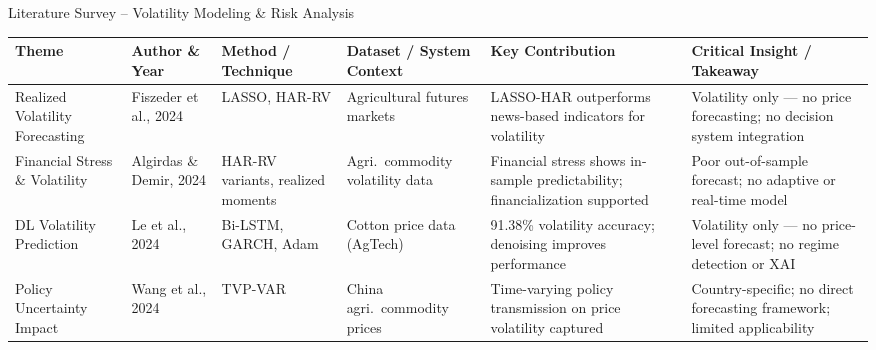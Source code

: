 \documentclass{beamer}
\begin{document}
\begin{frame}[label=lit_vol]{Literature Survey -- Volatility Modeling \& Risk Analysis}
\setlength{\tabcolsep}{2pt}
\renewcommand{\arraystretch}{1.3}
\tiny

\begin{tcolorbox}[enhanced, colback=white, colframe=accentorange!40, arc=4pt, boxrule=0.3pt,
  left=1pt, right=1pt, top=2pt, bottom=2pt, shadow={1pt}{-1pt}{0pt}{black!10}]
\begin{adjustbox}{max width=\textwidth}
\begin{tabular}{|L{1.5cm}|L{1.4cm}|L{1.6cm}|L{1.8cm}|L{2.0cm}|L{2.3cm}|}
\hline
{}
\textbf{Theme} & \textbf{Author \& Year} & \textbf{Method / Technique} & \textbf{Dataset / System Context} & \textbf{Key Contribution} & \textbf{Critical Insight / Takeaway} \\
\hline
Realized Volatility Forecasting & Fiszeder et al., 2024 & LASSO, HAR-RV & Agricultural futures markets & LASSO-HAR outperforms news-based indicators for volatility & Volatility only --- no price forecasting; no decision system integration \\ \hline
Financial Stress \& Volatility & Algirdas \& Demir, 2024 & HAR-RV variants, realized moments & Agri.\ commodity volatility data & Financial stress shows in-sample predictability; financialization supported & Poor out-of-sample forecast; no adaptive or real-time model \\ \hline
DL Volatility Prediction & Le et al., 2024 & Bi-LSTM, GARCH, Adam & Cotton price data (AgTech) & 91.38\% volatility accuracy; denoising improves performance & Volatility only --- no price-level forecast; no regime detection or XAI \\ \hline
Policy Uncertainty Impact & Wang et al., 2024 & TVP-VAR & China agri.\ commodity prices & Time-varying policy transmission on price volatility captured & Country-specific; no direct forecasting framework; limited applicability \\ \hline
\end{tabular}
\end{adjustbox}
\end{tcolorbox}

\end{frame}
\end{document}
